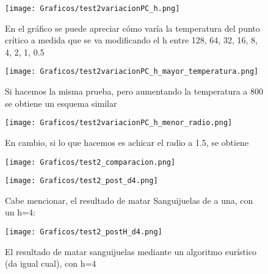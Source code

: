 \documentclass[double, 1.5in, 12pt]{beavtex}
\begin{document}
\begin{figure}[H]
\begin{center}
	\texttt{[image: Graficos/test2variacionPC\_h.png]}
	\caption{En el gr\'afico se puede apreciar c\'omo var\'ia la temperatura del punto cr\'itico a medida que se va modificando el h entre 128, 64, 32, 16, 8, 4, 2, 1, 0.5}
	\label{fig:frog}
	\end{center}
\end{figure}


\begin{figure}[H]
\begin{center}
	\texttt{[image: Graficos/test2variacionPC\_h\_mayor\_temperatura.png]}
	\caption{Si hacemos la misma prueba, pero aumentando la temperatura a 800 se obtiene un esquema similar}
	\label{fig:frog}
	\end{center}
\end{figure}


\begin{figure}[H]
\begin{center}
	\texttt{[image: Graficos/test2variacionPC\_h\_menor\_radio.png]}
	\caption{En cambio, si lo que hacemos es achicar el radio a 1.5, se obtiene}
	\label{fig:frog}
	\end{center}
\end{figure}

\begin{figure}[H]
\begin{center}
	\texttt{[image: Graficos/test2\_comparacion.png]}
	\caption{}
	\label{fig:frog}
	\end{center}
\end{figure}


\begin{figure}[H]
\begin{center}
	\texttt{[image: Graficos/test2\_post\_d4.png]}
	\caption{Cabe mencionar, el resultado de matar Sanguijuelas de a una, con un h=4:}
	\label{fig:frog}
	\end{center}
\end{figure}


\begin{figure}[H]
\begin{center}
	\texttt{[image: Graficos/test2\_postH\_d4.png]}
	\caption{El resultado de matar sanguijuelas mediante un algoritmo eur\'istico (da igual cual), con h=4}
	\label{fig:frog}
	\end{center}
\end{figure}
\end{document}
